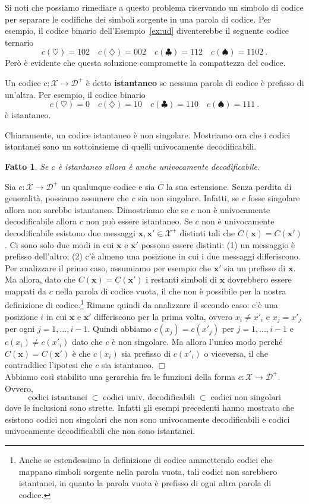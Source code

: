 \documentclass[11pt]{article}
\newtheorem{fact}[theorem]{Fatto}
\newenvironment{proof}{{\textsc{Dimostrazione.}\ }}{\hfill$\Box$\\[2mm]}
\newcommand{\bx}{ \boldsymbol{x} }
\newcommand{\scD}{\mathcal{D}}
\newcommand{\scX}{\mathcal{X}}
\begin{document}
Si noti che possiamo rimediare a questo problema riservando un simbolo di codice per separare le codifiche dei simboli sorgente in una parola di codice. Per esempio, il codice binario dell'Esempio~\ref{ex:ud} diventerebbe il seguente codice ternario
\[
    c(\heartsuit) = 102 \quad c(\diamondsuit) = 002 \quad c(\clubsuit) = 112 \quad c(\spadesuit) = 1102~.
\]
Però è evidente che questa soluzione compromette la compattezza del codice.

Un codice $c : \scX \to \scD^+$ è detto \textbf{istantaneo} se nessuna parola di codice è prefisso di un'altra. Per esempio, il codice binario
\[
    c(\heartsuit) = 0 \quad c(\diamondsuit) = 10 \quad c(\clubsuit) = 110 \quad c(\spadesuit) = 111~.
\]
è istantaneo.

Chiaramente, un codice istantaneo è non singolare. Mostriamo ora che i codici istantanei sono un sottoinsieme di quelli univocamente decodificabili.
%
\begin{fact}
Se $c$ è istantaneo allora è anche univocamente decodificabile.
\end{fact}
%
\begin{proof}
Sia $c : \scX\to\scD^+$ un qualunque codice e sia $C$ la sua estensione. Senza perdita di generalità, possiamo assumere che $c$ sia non singolare. Infatti, se $c$ fosse singolare allora non sarebbe istantaneo. Dimostriamo che se $c$ non è univocamente decodificabile allora $c$ non può essere istantaneo. Se $c$ non è univocamente decodificabile esistono due messaggi $\bx,\bx'\in\scX^+$ distinti tali che $C(\bx) = C(\bx')$. Ci sono solo due modi in cui $\bx$ e $\bx'$ possono essere distinti: (1) un messaggio è prefisso dell'altro; (2) c'è almeno una posizione in cui i due messaggi differiscono. Per analizzare il primo caso, assumiamo per esempio che $\bx'$ sia un prefisso di $\bx$. Ma allora, dato che $C(\bx) = C(\bx')$ i restanti simboli di $\bx$ dovrebbero essere mappati da $c$ nella parola di codice vuota, il che non è possibile per la nostra definizione di codice.\footnote{Anche se estendessimo la definizione di codice ammettendo codici che mappano simboli sorgente nella parola vuota, tali codici non sarebbero istantanei, in quanto la parola vuota è prefisso di ogni altra parola di codice.} Rimane quindi da analizzare il secondo caso: c'è una posizione $i$ in cui $\bx$ e $\bx'$ differiscono per la prima volta, ovvero $x_i \neq x'_i$ e $x_j = x'_j$ per ogni $j = 1,\dots,i-1$. Quindi abbiamo $c(x_j)=c(x'_j)$ per $j=1,\dots,i-1$ e $c(x_i) \neq c(x'_i)$ dato che $c$ è non singolare. Ma allora l'unico modo perché $C(\bx) = C(\bx')$ è che $c(x_i)$ sia prefisso di $c(x'_i)$ o viceversa, il che contraddice l'ipotesi che $c$ sia istantaneo.
\end{proof}
%
Abbiamo così stabilito una gerarchia fra le funzioni della forma $c:\scX\to\scD^+$. Ovvero,
\[
    \text{codici istantanei} \;\subset\; \text{codici univ.\ decodificabili} \;\subset\; \text{codici non singolari}
\]
dove le inclusioni sono strette. Infatti gli esempi precedenti hanno mostrato che esistono codici non singolari che non sono univocamente decodificabili e codici univocamente decodificabili che non sono istantanei.
\end{document}

